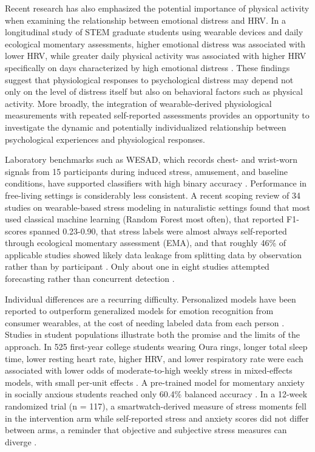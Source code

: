 \documentclass[11pt, a4paper, oneside]{article}
\begin{document}
Recent research has also emphasized the potential importance of physical activity when examining the relationship between emotional distress and HRV. In a longitudinal study of STEM graduate students using wearable devices and daily ecological momentary assessments, higher emotional distress was associated with lower HRV, while greater daily physical activity was associated with higher HRV specifically on days characterized by high emotional distress \cite{reference 2}. These findings suggest that physiological responses to psychological distress may depend not only on the level of distress itself but also on behavioral factors such as physical activity. More broadly, the integration of wearable-derived physiological measurements with repeated self-reported assessments provides an opportunity to investigate the dynamic and potentially individualized relationship between psychological experiences and physiological responses.

Laboratory benchmarks such as WESAD, which records chest- and wrist-worn signals from 15 participants during induced stress, amusement, and baseline conditions, have supported classifiers with high binary accuracy \cite{reference 3}. Performance in free-living settings is considerably less consistent. A recent scoping review of 34 studies on wearable-based stress modeling in naturalistic settings found that most used classical machine learning (Random Forest most often), that reported F1-scores spanned 0.23-0.90, that stress labels were almost always self-reported through ecological momentary assessment (EMA), and that roughly 46\% of applicable studies showed likely data leakage from splitting data by observation rather than by participant \cite{reference 4}. Only about one in eight studies attempted forecasting rather than concurrent detection \cite{reference 4}.

Individual differences are a recurring difficulty. Personalized models have been reported to outperform generalized models for emotion recognition from consumer wearables, at the cost of needing labeled data from each person \cite{reference 5}. Studies in student populations illustrate both the promise and the limits of the approach. In 525 first-year college students wearing Oura rings, longer total sleep time, lower resting heart rate, higher HRV, and lower respiratory rate were each associated with lower odds of moderate-to-high weekly stress in mixed-effects models, with small per-unit effects \cite{reference 6}. A pre-trained model for momentary anxiety in socially anxious students reached only 60.4\% balanced accuracy \cite{reference 7}. In a 12-week randomized trial (n = 117), a smartwatch-derived measure of stress moments fell in the intervention arm while self-reported stress and anxiety scores did not differ between arms, a reminder that objective and subjective stress measures can diverge \cite{reference 8}.
\end{document}
